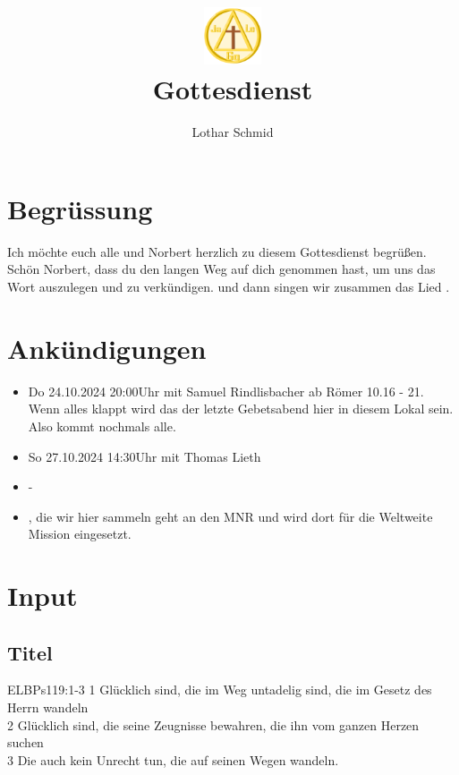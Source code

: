 \documentclass[12pt,a4paper]{scrarticle}
\title{\includegraphics[height=48pt]{assets/images/logo.png}\\Gottesdienst}
\author{Lothar Schmid}
\begin{document}
\maketitle
\section{Begrüssung}

Ich möchte euch alle und Norbert herzlich zu diesem Gottesdienst begrüßen.
Schön Norbert, dass du den langen Weg auf dich genommen hast, um uns das Wort auszulegen und zu verkündigen. 
\beten{} und dann singen wir zusammen das Lied .

\section{Ankündigungen}
\begin{itemize}
    \item {} Do 24.10.2024 20:00Uhr mit Samuel Rindlisbacher ab Römer 10.16 - 21. Wenn alles klappt wird das der letzte Gebetsabend hier in diesem Lokal sein. Also kommt nochmals alle.
    \item {} So 27.10.2024 14:30Uhr mit Thomas Lieth
    \item {} -
    \item {}, die wir hier sammeln geht an den MNR und wird dort für die Weltweite Mission eingesetzt.    
\end{itemize}

\section{ Input }
\begin{spacing}{1.5}
\subsection{Titel}
\begin{bibeltext}{ELB}{Ps}{119:1-3}
1 Glücklich sind, die im Weg untadelig sind, die im Gesetz des Herrn wandeln\\
2 Glücklich sind, die seine Zeugnisse bewahren, die ihn vom ganzen Herzen suchen\\
3 Die auch kein Unrecht tun, die auf seinen Wegen wandeln.
\end{bibeltext}
\end{spacing}
\end{document}

